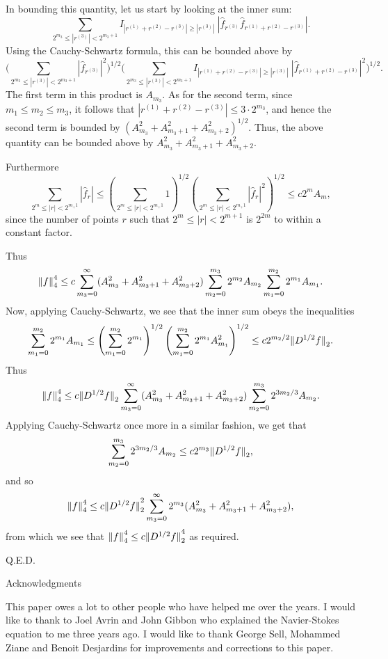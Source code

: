 In bounding this quantity, let us start by looking at the inner sum:
$$ \sum_{2^{m_3} \le |r^{(3)}| < 2^{m_3+1}}
   I_{|r^{(1)}+r^{(2)}-r^{(3)}| \ge |r^{(3)}|} \
   |\hat f_{r^{(3)}} \hat f_{r^{(1)}+r^{(2)}-r^{(3)}}| .$$
Using the Cauchy-Schwartz formula, this can be bounded above by
$$ \big(\sum_{2^{m_3} \le |r^{(3)}| < 2^{m_3+1}} 
     |\hat f_{r^{(3)}}|^2 \big)^{1/2} 
    \big(\sum_{2^{m_3} \le |r^{(3)}| < 2^{m_3+1}}
     I_{|r^{(1)}+r^{(2)}-r^{(3)}| \ge |r^{(3)}|} \
     |\hat f_{r^{(1)}+r^{(2)}-r^{(3)}}|^2
     \big)^{1/2}. $$
The first term in this product is $A_{m_3}$.  As for the second term,
since $m_1 \le m_2 \le m_3$, it follows that
$|r^{(1)}+r^{(2)}-r^{(3)}| \le 3\cdot 2^{m_3}$, and hence the second
term is bounded by $(A_{m_3}^2 + A_{m_3+1}^2 + A_{m_3+2}^2)^{1/2}$.
Thus, the above quantity can be bounded above by 
$A_{m_3}^2 + A_{m_3+1}^2 + A_{m_3+2}^2$.

Furthermore
$$ \sum_{2^{m} \le |r| < 2^{m_+1}} | \hat f_r |
   \le
   \left(\sum_{2^{m} \le |r| < 2^{m_+1}} 1 \right)^{1/2}
   \left(\sum_{2^{m} \le |r| < 2^{m_+1}} | \hat f_r |^2 \right)^{1/2}
   \le
   c 2^m A_m ,$$
since the number of points $r$ such that $2^{m} \le |r| < 2^{m+1}$ is
$2^{2m}$ to within a constant factor.

Thus
$$ {\mathopen\|f\mathclose\|}_4^4 \le c
   \sum_{m_3=0}^\infty 
   (A_{m_3}^2 + A_{m_3+1}^2 + A_{m_3+2}^2)
   \sum_{m_2=0}^{m_3} 
   2^{m_2} A_{m_2}
   \sum_{m_1=0}^{m_2}
   2^{m_1} A_{m_1} .$$
Now, applying Cauchy-Schwartz, we see that the inner sum obeys the
inequalities
$$ \sum_{m_1=0}^{m_2}
   2^{m_1} A_{m_1}
   \le
   \left( \sum_{m_1=0}^{m_2} 2^{m_1} \right)^{1/2}
   \left( \sum_{m_1=0}^{m_2} 2^{m_1} A_{m_1}^2 \right)^{1/2}
   \le c 2^{m_2/2} {\mathopen\|D^{1/2} f\mathclose\|}_2 .$$
Thus
$$ {\mathopen\|f\mathclose\|}_4^4 \le c {\mathopen\|D^{1/2} f\mathclose\|}_2
   \sum_{m_3=0}^\infty 
   (A_{m_3}^2 + A_{m_3+1}^2 + A_{m_3+2}^2)
   \sum_{m_2=0}^{m_3} 
   2^{3 m_2/3} A_{m_2} .$$
Applying Cauchy-Schwartz once more in a similar fashion, we get that
$$ \sum_{m_2=0}^{m_3} 
   2^{3 m_2/3} A_{m_2}
   \le
   c 2^{m_3} {\mathopen\|D^{1/2} f\mathclose\|}_2 ,$$
and so
$$ {\mathopen\|f\mathclose\|}_4^4 \le c {\mathopen\|D^{1/2} f\mathclose\|}_2^2 
   \sum_{m_3=0}^\infty
   2^{m_3}
   (A_{m_3}^2 + A_{m_3+1}^2 + A_{m_3+2}^2) ,$$
from which we see that ${\mathopen\|f\mathclose\|}_4^4 \le c {\mathopen\|D^{1/2} f\mathclose\|}_2^4$ as required.

\hfill Q.E.D.

\beginsection Acknowledgments

This paper owes a lot to other people who have helped me over the years.
I would like to thank to Joel Avrin and John Gibbon
who explained the Navier-Stokes equation to me three years ago.
I would like to thank George Sell,
Mohammed Ziane and Benoit Desjardins for improvements and
corrections to this
paper.

